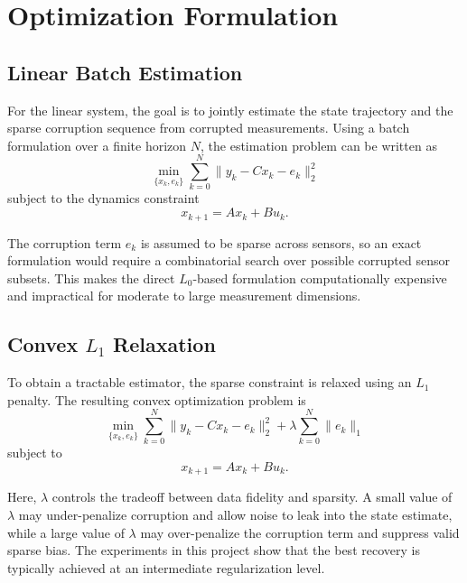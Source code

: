 \documentclass[conference]{IEEEtran}
\begin{document}
\section{Optimization Formulation}

\subsection{Linear Batch Estimation}

For the linear system, the goal is to jointly estimate the state trajectory and the sparse corruption sequence from corrupted measurements. Using a batch formulation over a finite horizon $N$, the estimation problem can be written as
\begin{equation}
\min_{\{x_k,e_k\}} \sum_{k=0}^{N} \|y_k - Cx_k - e_k\|_2^2
\end{equation}
subject to the dynamics constraint
\begin{equation}
x_{k+1} = Ax_k + Bu_k.
\end{equation}

The corruption term $e_k$ is assumed to be sparse across sensors, so an exact formulation would require a combinatorial search over possible corrupted sensor subsets. This makes the direct $L_0$-based formulation computationally expensive and impractical for moderate to large measurement dimensions. %

\subsection{Convex $L_1$ Relaxation}

To obtain a tractable estimator, the sparse constraint is relaxed using an $L_1$ penalty. The resulting convex optimization problem is
\begin{equation}
\min_{\{x_k,e_k\}} \sum_{k=0}^{N} \|y_k - Cx_k - e_k\|_2^2 + \lambda \sum_{k=0}^{N}\|e_k\|_1
\end{equation}
subject to
\begin{equation}
x_{k+1} = Ax_k + Bu_k.
\end{equation}

Here, $\lambda$ controls the tradeoff between data fidelity and sparsity. A small value of $\lambda$ may under-penalize corruption and allow noise to leak into the state estimate, while a large value of $\lambda$ may over-penalize the corruption term and suppress valid sparse bias. The experiments in this project show that the best recovery is typically achieved at an intermediate regularization level. %
\end{document}
